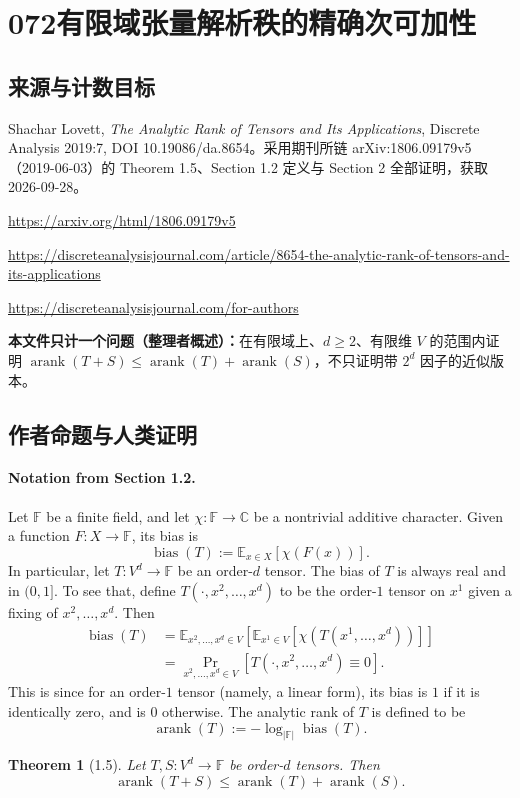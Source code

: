 \documentclass[UTF8,11pt]{ctexart}
\newtheorem*{theorem}{Theorem}
\theoremstyle{definition}
\begin{document}
\section*{072\quad 有限域张量解析秩的精确次可加性}
\subsection*{来源与计数目标}
Shachar Lovett, \emph{The Analytic Rank of Tensors and Its Applications}, Discrete Analysis 2019:7, DOI 10.19086/da.8654。采用期刊所链 arXiv:1806.09179v5（2019-06-03）的 Theorem 1.5、Section 1.2 定义与 Section 2 全部证明，获取2026-09-28。
\par\url{https://arxiv.org/html/1806.09179v5}
\par\url{https://discreteanalysisjournal.com/article/8654-the-analytic-rank-of-tensors-and-its-applications}
\par\url{https://discreteanalysisjournal.com/for-authors}
\par\textbf{本文件只计一个问题（整理者概述）：}在有限域上、$d\geq2$、有限维 $V$ 的范围内证明 $\operatorname{arank}(T+S)\leq\operatorname{arank}(T)+\operatorname{arank}(S)$，不只证明带 $2^d$ 因子的近似版本。
\subsection*{作者命题与人类证明}

\paragraph{Notation from Section 1.2.}
Let $\mathbb F$ be a finite field, and let $\chi:\mathbb F\to\mathbb C$ be a nontrivial additive character. Given a function $F:X\to\mathbb F$, its bias is
\[
\operatorname{bias}(T):=\mathbb E_{x\in X}[\chi(F(x))].
\]
In particular, let $T:V^d\to\mathbb F$ be an order-$d$ tensor. The bias of $T$ is always real and in $(0,1]$. To see that, define $T(\cdot,x^2,\ldots,x^d)$ to be the order-$1$ tensor on $x^1$ given a fixing of $x^2,\ldots,x^d$. Then
\begin{align*}
\operatorname{bias}(T)&=\mathbb E_{x^2,\ldots,x^d\in V}\left[\mathbb E_{x^1\in V}[\chi(T(x^1,\ldots,x^d))]\right]\\
&=\Pr_{x^2,\ldots,x^d\in V}[T(\cdot,x^2,\ldots,x^d)\equiv0]. \tag{1}
\end{align*}
This is since for an order-$1$ tensor (namely, a linear form), its bias is $1$ if it is identically zero, and is $0$ otherwise. The analytic rank of $T$ is defined to be
\[
\operatorname{arank}(T):=-\log_{|\mathbb F|}\operatorname{bias}(T).
\]
\begin{theorem}[1.5]
Let $T,S:V^d\to\mathbb F$ be order-$d$ tensors. Then
\[
\operatorname{arank}(T+S)\leq\operatorname{arank}(T)+\operatorname{arank}(S).
\]
\end{theorem}
\end{document}
